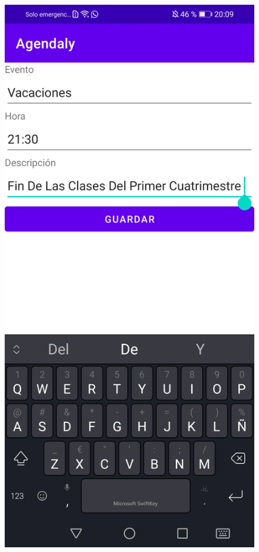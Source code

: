 \documentclass[a4paper,openright,12pt]{article}
\begin{document}
\begin{figure}
            \includegraphics[scale=0.05]{addevent.jpg} \hfill

\end{figure}
\end{document}
